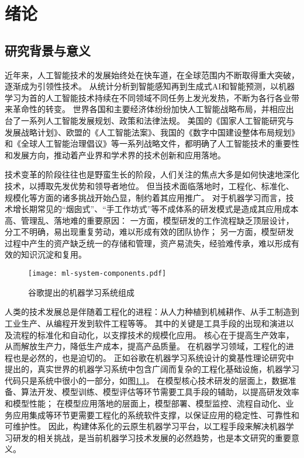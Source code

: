 
\chapter{绪论}


%
\section{研究背景与意义}

近年来，人工智能技术的发展始终处在快车道，在全球范围内不断取得重大突破，逐渐成为引领性技术。
从统计分析到智能感知再到生成式AI和智能预测，以机器学习为首的人工智能技术持续在不同领域不同任务上发光发热，不断为各行各业带来革命性的转变。
世界各国和主要经济体纷纷加快人工智能战略布局，并相应出台了一系列人工智能发展规划、政策和法律法规。
美国的《国家人工智能研究与发展战略计划》、欧盟的《人工智能法案》、我国的《数字中国建设整体布局规划》和《全球人工智能治理倡议》等一系列战略文件，都明确了人工智能技术的重要性和发展方向，推动着产业界和学术界的技术创新和应用落地。

技术变革的阶段往往也是野蛮生长的阶段，人们关注的焦点大多是如何快速地深化技术，以搏取先发优势和领导者地位。
但当技术面临落地时，工程化、标准化、规模化等方面的诸多挑战开始凸显，制约着其应用推广。
对于机器学习而言，技术增长期常见的“烟囱式”、“手工作坊式”等不成体系的研发模式是造成其应用成本高、管理乱、落地难的重要原因：
一方面，模型研发的工作流程缺乏顶层设计，分工不明确，易出现重复劳动，难以形成有效的团队协作；
另一方面，模型研发过程中产生的资产缺乏统一的存储和管理，资产易流失，经验难传承，难以形成有效的知识沉淀和复用。

\begin{figure}
  \centering
  \texttt{[image: ml-system-components.pdf]}
  \caption{谷歌提出的机器学习系统组成\cite{Scu15}}
  \label{fig:mlcomponents}
\end{figure}

人类的技术发展总是伴随着工程化的进程：从人力种植到机械耕作、从手工制造到工业生产、从编程开发到软件工程等等。
其中的关键是工具手段的出现和演进以及流程的标准化和自动化，以支撑技术的规模化应用。
核心在于提高生产效率，从而解放生产力，降低生产成本，提高产品质量。
在机器学习领域，工程化的进程也是必然的，也是迫切的。
正如谷歌在机器学习系统设计的奠基性理论研究\cite{Scu15}中提出的，真实世界的机器学习系统中包含广阔而复杂的工程化基础设施，机器学习代码只是系统中很小的一部分，如图\ref{fig:mlcomponents}。
在模型核心技术研发的层面上，数据准备、算法开发、模型训练、模型评估等环节需要工具手段的辅助，以提高研发效率和模型性能；
在模型应用落地的层面上，模型部署、模型监控、流程自动化、业务应用集成等环节更需要工程化的系统软件支撑，以保证应用的稳定性、可靠性和可维护性。
因此，构建体系化的云原生机器学习平台，以工程手段来解决机器学习研发的相关挑战，是当前机器学习技术发展的必然趋势，也是本文研究的重要意义。

